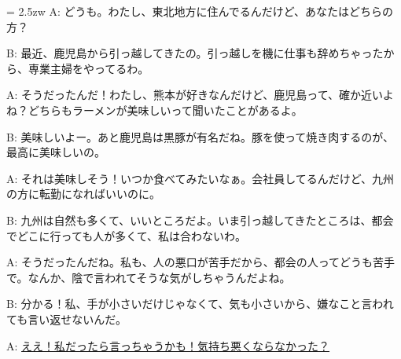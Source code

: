 \documentclass[11pt]{amsart}
\title{}
\author{}
\newenvironment{hangall}[1]{\hangindent = 2.5zw\everypar{\hangindent = 2.5zw}}{}
\begin{document}
\maketitle
\begin{hangall}{}%
A: どうも。わたし、東北地方に住んでるんだけど、あなたはどちらの方？

B: 最近、鹿児島から引っ越してきたの。引っ越しを機に仕事も辞めちゃったから、専業主婦をやってるわ。

A: そうだったんだ！わたし、熊本が好きなんだけど、鹿児島って、確か近いよね？どちらもラーメンが美味しいって聞いたことがあるよ。

B: 美味しいよー。あと鹿児島は黒豚が有名だね。豚を使って焼き肉するのが、最高に美味しいの。

A: それは美味しそう！いつか食べてみたいなぁ。会社員してるんだけど、九州の方に転勤になればいいのに。

B: 九州は自然も多くて、いいところだよ。いま引っ越してきたところは、都会でどこに行っても人が多くて、私は合わないわ。

A: そうだったんだね。私も、人の悪口が苦手だから、都会の人ってどうも苦手で。なんか、陰で言われてそうな気がしちゃうんだよね。

B: 分かる！私、手が小さいだけじゃなくて、気も小さいから、嫌なこと言われても言い返せないんだ。

A: \ul{ええ！私だったら言っちゃうかも！気持ち悪くならなかった？}\end{hangall}
\end{document}
